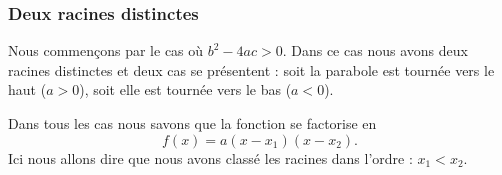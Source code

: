 \subsubsection{Deux racines distinctes}

Nous commençons par le cas où \( b^2-4ac>0\). Dans ce cas nous avons deux racines distinctes et deux cas se présentent : soit la parabole est tournée vers le haut (\( a>0\)), soit elle est tournée vers le bas (\( a<0\)).

Dans tous les cas nous savons que la fonction se factorise en
\begin{equation}
    f(x)=a(x-x_1)(x-x_2).
\end{equation}
Ici nous allons dire que nous avons classé les racines dans l'ordre : \( x_1<x_2\).
